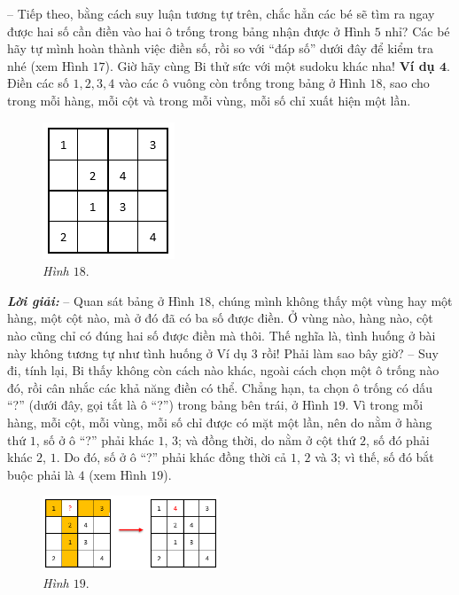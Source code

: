 	-- Tiếp theo, bằng cách suy luận tương tự trên, chắc hẳn các bé sẽ tìm ra ngay được hai số cần điền vào hai ô trống trong bảng nhận được ở Hình $5$ nhỉ? Các bé hãy tự mình hoàn thành việc điền số, rồi so với “đáp số” dưới đây để kiểm tra nhé (xem Hình $17$).
	\vskip 0.1cm
	Giờ hãy cùng Bi thử sức với một sudoku  khác nha!
	\vskip 0.1cm
		\textbf{\color{toancuabi}Ví dụ $\pmb{4.}$} Điền các số $1, 2, 3, 4$ vào các ô vuông còn trống trong bảng ở Hình $18$, sao cho trong mỗi hàng, mỗi cột và trong mỗi vùng, mỗi số chỉ xuất hiện một lần.
		\vskip 0.1cm
		\begin{figure}
			\centering
			\vspace*{-18pt}
			\captionsetup{labelformat= empty, justification=centering}
			\includegraphics[scale=0.8]{pic7}
			\caption{\small\textit{Hình $18.$}}
			\vspace*{-20pt}
		\end{figure}
	\textbf{\color{toancuabi}\textit{Lời giải:}}
	\vskip 0.1cm
	-- Quan sát bảng ở Hình $18$, chúng mình không thấy một vùng hay một hàng, một cột nào, mà ở đó đã có ba số được điền. Ở vùng nào, hàng nào, cột nào cũng chỉ có đúng hai số được điền mà thôi. Thế nghĩa là, tình huống ở bài này không tương tự như tình huống ở Ví dụ $3$ rồi! Phải làm sao bây giờ?
	\vskip 0.2cm
	-- Suy đi, tính lại, Bi thấy không còn cách nào khác, ngoài cách chọn một ô trống nào đó, rồi cân nhắc các khả năng điền có thể. Chẳng hạn, ta chọn ô trống có dấu “?” (dưới đây, gọi tắt là ô “?”) trong bảng bên trái, ở Hình $19$. Vì trong mỗi hàng, mỗi cột, mỗi vùng, mỗi số chỉ được có mặt một lần, nên do nằm ở hàng thứ $1$, số ở ô “?” phải khác $1$, $3$; và đồng thời, do nằm ở cột thứ $2$, số đó phải khác $2$, $1$. Do đó, số ở ô “?” phải khác đồng thời cả $1$, $2$ và $3$; vì thế, số đó bắt buộc phải là $4$ (xem Hình $19$).
	\vskip 0.1cm
		\begin{figure}
			\centering
			\vspace*{-15pt}
			\captionsetup{labelformat= empty, justification=centering}
			\includegraphics[width=0.47\textwidth]{pic8}
			\vspace*{-5pt}
			\caption{\small\textit{Hình $19.$}}
			\vspace*{-25pt}
		\end{figure}
